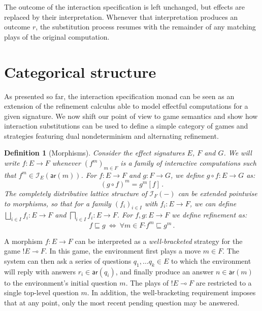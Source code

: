 \documentclass[draft,11pt]{report}
\newtheorem{definition}{Definition}
\newcommand{\kw}[1]{\ensuremath{ \mathsf{#1} }}
\newcommand{\bdot}{\boldsymbol{\cdot}}
\begin{document}
The outcome of the interaction specification is left unchanged,
but effects are replaced by their interpretation.
Whenever that interpretation produces an outcome $r$,
the substitution process resumes with the remainder of any
matching plays of the original computation.


\section{Categorical structure} \label{sec:intm:cat} %

As presented so far,
the interaction specification monad
can be seen as an extension of the refinement calculus
able to model effectful computations
for a given signature.
We now shift our point of view to game semantics
and show how interaction substitutions
can be used to define a simple category of games and strategies
featuring dual nondeterminism and alternating refinement.

\begin{definition}[Morphisms]
Consider the effect signatures $E$, $F$ and $G$.
We will write $f : E \rightarrow F$
whenever $(f^m)_{m \in F}$ is a family of interactive computations
such that $f^m \in \mathcal{I}_E(\kw{ar}(m))$.
For $f : E \rightarrow F$ and $g : F \rightarrow G$,
we define $g \circ f : E \rightarrow G$ as:
\[ (g \circ f)^m = g^m[f] \,. \]
The completely distributive lattice structure
of $\mathcal{I}_F(-)$ can be extended pointwise
to morphisms,
so that for a family $(f_i)_{i \in I}$
with $f_i : E \rightarrow F$,
we can define
$\bigsqcup_{i \in I} f_i : E \rightarrow F$ and
$\bigsqcap_{i \in I} f_i : E \rightarrow F$.
For $f, g : E \rightarrow F$
we define refinement as:
\[
    f \sqsubseteq g \: \Leftrightarrow \:
    \forall m \in F \bdot f^m \sqsubseteq g^m \,.
\]
\end{definition}

A morphism $f : E \rightarrow F$
can be interpreted as a \emph{well-bracketed} strategy for the game
${!E} \multimap F$.
In this game,
the environment first plays a move $m \in F$.
The system can then ask a series of questions
$q_1, \ldots q_k \in E$
to which the environment will reply with
answers $r_i \in \kw{ar}(q_i)$,
and finally produce an answer $n \in \kw{ar}(m)$
to the environment's initial question $m$.
The plays of ${!E} \multimap F$
are restricted to a single top-level question $m$.
In addition, the well-bracketing requirement
imposes that at any point,
only the most recent pending question
may be answered.
\end{document}
